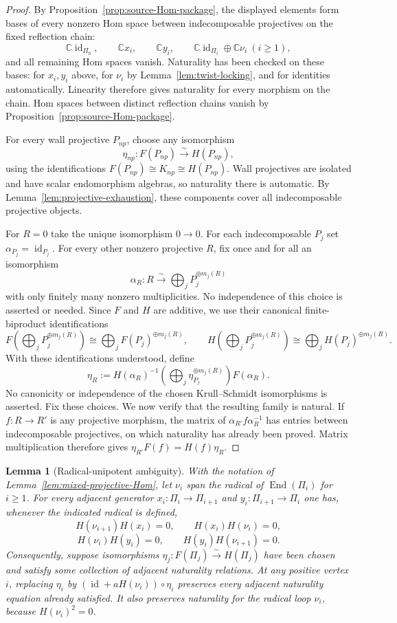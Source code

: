 \documentclass[12pt,leqno]{amsart}
\numberwithin{equation}{section}
\newtheorem{lem}[thm]{Lemma}
\newcommand{\End}{\operatorname{End}}
\newcommand{\id}{\operatorname{id}}
\def\C{\mathbb{C}}
\begin{document}
\begin{proof}
By Proposition~\ref{prop:source-Hom-package}, the displayed elements form
bases of every nonzero Hom space between indecomposable projectives on the
fixed reflection chain:
\[
 \C\id_{\Pi_0},\qquad \C x_i,\qquad \C y_i,
 \qquad \C\id_{\Pi_i}\oplus\C\nu_i\ (i\ge1),
\]
and all remaining Hom spaces vanish.  Naturality has been checked on these
bases: for $x_i,y_i$ above, for $\nu_i$ by
Lemma~\ref{lem:twist-locking}, and for identities automatically.  Linearity
therefore gives naturality for every morphism on the chain.  Hom spaces between distinct reflection chains vanish by
Proposition~\ref{prop:source-Hom-package}.

For every wall projective $P_{np}$, choose any isomorphism
\[
 \eta_{np}:F(P_{np})\xrightarrow{\sim}H(P_{np}),
\]
using the identifications
$F(P_{np})\cong K_{np}\cong H(P_{np})$.  Wall projectives are isolated and
have scalar endomorphism algebras, so naturality there is automatic.
By Lemma~\ref{lem:projective-exhaustion}, these components cover all
indecomposable projective objects.

For $R=0$ take the unique isomorphism $0\to0$.  For each
indecomposable $P_j$ set $\alpha_{P_j}=\id_{P_j}$.  For every other
nonzero projective $R$, fix once and for all an isomorphism
\[
 \alpha_R:R\xrightarrow{\sim}
 \bigoplus_j P_j^{\oplus m_j(R)}
\]
with only finitely many nonzero multiplicities.  No independence of this
choice is asserted or needed.  Since $F$ and $H$ are additive, we use their canonical finite-biproduct identifications
\[
 F\!\left(\bigoplus_jP_j^{\oplus m_j(R)}\right)
 \cong\bigoplus_jF(P_j)^{\oplus m_j(R)},
 \qquad
 H\!\left(\bigoplus_jP_j^{\oplus m_j(R)}\right)
 \cong\bigoplus_jH(P_j)^{\oplus m_j(R)}.
\]
With these identifications understood, define
\[
 \eta_R:=
 H(\alpha_R)^{-1}
 \left(\bigoplus_j\eta_{P_j}^{\oplus m_j(R)}\right)
 F(\alpha_R).
\]
No canonicity or independence of the chosen Krull--Schmidt isomorphisms is
asserted.  Fix these choices.  We now verify that the resulting family is
natural.  If $f:R\to R'$ is any projective morphism, the matrix of
$\alpha_{R'}f\alpha_R^{-1}$ has entries between indecomposable
projectives, on which naturality has already been proved.  Matrix
multiplication therefore gives
$\eta_{R'}F(f)=H(f)\eta_R$.
\end{proof}

\begin{lem}[Radical-unipotent ambiguity]\label{lem:radical-annihilates-arrows}
With the notation of Lemma~\ref{lem:mixed-projective-Hom}, let
$\nu_i$ span the radical of $\End(\Pi_i)$ for $i\ge1$.  For every
adjacent generator $x_i:\Pi_i\to\Pi_{i+1}$ and
$y_i:\Pi_{i+1}\to\Pi_i$ one has, whenever the indicated radical is
defined,
\[
 H(\nu_{i+1})H(x_i)=0,\qquad H(x_i)H(\nu_i)=0,
\]
\[
 H(\nu_i)H(y_i)=0,\qquad H(y_i)H(\nu_{i+1})=0.
\]
Consequently, suppose isomorphisms
$\eta_j:F(\Pi_j)\xrightarrow{\sim}H(\Pi_j)$ have been chosen and satisfy
some collection of adjacent naturality relations.  At any positive vertex
$i$, replacing $\eta_i$ by
$(\id+aH(\nu_i))\circ\eta_i$ preserves every adjacent naturality equation
already satisfied.  It also preserves naturality for the radical loop
$\nu_i$, because $H(\nu_i)^2=0$.
\end{lem}
\end{document}
